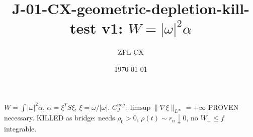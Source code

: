 \documentclass[11pt]{article}
\begin{document}
\title{J-01-CX-geometric-depletion-kill-test v1: $W=|\omega|^2\alpha$}\author{ZFL-CX}\date{\today}\maketitle
$W=\int|\omega|^2\alpha$, $\alpha=\xi^TS\xi$, $\xi=\omega/|\omega|$. $C_J^{neg}:\limsup\|\nabla\xi\|_{L^\infty}=+\infty$ PROVEN necessary. KILLED as bridge: needs $\rho_0>0$, $\rho(t)\sim r_n\downarrow0$, no $W_+\le f$ integrable.
\end{document}
